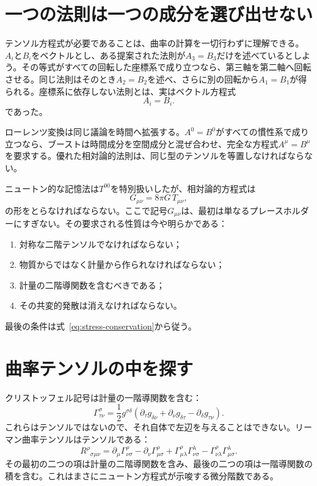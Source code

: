 \section{一つの法則は一つの成分を選び出せない}

テンソル方程式が必要であることは、曲率の計算を一切行わずに理解できる。\(A_i\)と\(B_i\)をベクトルとし、ある提案された法則が\(A_3=B_3\)だけを述べているとしよう。その等式がすべての回転した座標系で成り立つなら、第三軸を第二軸へ回転させる。同じ法則はそのとき\(A_2=B_2\)を述べ、さらに別の回転から\(A_1=B_1\)が得られる。座標系に依存しない法則とは、実はベクトル方程式
\begin{equation}
 A_i=B_i.
\end{equation}
であった。

ローレンツ変換は同じ議論を時間へ拡張する。\(A^0=B^0\)がすべての慣性系で成り立つなら、ブーストは時間成分を空間成分と混ぜ合わせ、完全な方程式\(A^\mu=B^\mu\)を要求する。優れた相対論的法則は、同じ型のテンソルを等置しなければならない。

ニュートン的な記憶法は\(T^{00}\)を特別扱いしたが、相対論的方程式は
\begin{equation}
 G_{\mu\nu}=8\pi G\,T_{\mu\nu},
 \label{eq:field-schematic}
\end{equation}
の形をとらなければならない。ここで記号\(G_{\mu\nu}\)は、最初は単なるプレースホルダーにすぎない。その要求される性質は今や明らかである：
\begin{enumerate}
 \item 対称な二階テンソルでなければならない；
 \item 物質からではなく計量から作られなければならない；
 \item 計量の二階導関数を含むべきである；
 \item その共変的発散は消えなければならない。
\end{enumerate}
最後の条件は式~\eqref{eq:stress-conservation}から従う。

\section{曲率テンソルの中を探す}

クリストッフェル記号は計量の一階導関数を含む：
\begin{equation}
 \Gamma^\sigma_{\tau\nu}
 =
 \frac12 g^{\sigma\delta}
 \left(
 \partial_\tau g_{\delta\nu}
 +\partial_\nu g_{\delta\tau}
 -\partial_\delta g_{\tau\nu}
 \right).
 \label{eq:christoffel}
\end{equation}
これらはテンソルではないので、それ自体で左辺を与えることはできない。リーマン曲率テンソルはテンソルである：
\begin{equation}
 R^\rho{}_{\sigma\mu\nu}
 =
 \partial_\mu\Gamma^\rho_{\nu\sigma}
 -\partial_\nu\Gamma^\rho_{\mu\sigma}
 +\Gamma^\rho_{\mu\lambda}\Gamma^\lambda_{\nu\sigma}
 -\Gamma^\rho_{\nu\lambda}\Gamma^\lambda_{\mu\sigma}.
 \label{eq:riemann}
\end{equation}
その最初の二つの項は計量の二階導関数を含み、最後の二つの項は一階導関数の積を含む。これはまさにニュートン方程式が示唆する微分階数である。

